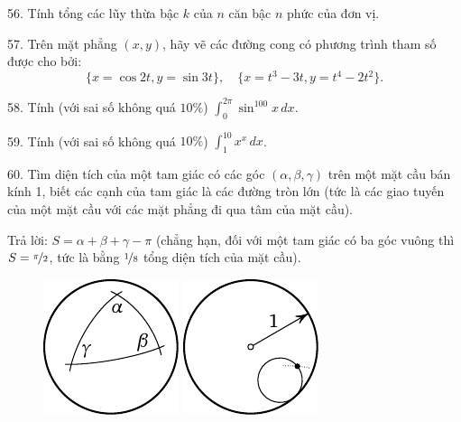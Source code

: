 \begin{problem}{56.}
	Tính tổng các lũy thừa bậc $k$ của $n$ căn bậc $n$ phức của đơn vị.
\end{problem}

\begin{problem}{57.}
	Trên mặt phẳng $(x,y)$, hãy vẽ các đường cong có phương trình tham số được cho bởi:
	\begin{equation*}
		\{x=\cos 2t, y=\sin 3t\},\quad
		\{x=t^3-3t, y=t^4-2t^2\}.
	\end{equation*}
	\vspace{-2\baselineskip}%
\end{problem}

\begin{problem}{58.}
	Tính (với sai số không quá $10 \%$) $\int_0^{2\pi}\sin^{100}x\,dx$.
\end{problem}

\begin{problem}{59.}
	Tính (với sai số không quá $10 \%$) $\int_1^{10} x^x\,dx$.
\end{problem}

\begin{problem}{60.}
	Tìm diện tích của một tam giác có các góc $(\alpha, \beta, \gamma)$ trên một mặt cầu bán kính 1, biết các cạnh của tam giác là các đường tròn lớn (tức là các giao tuyến của một mặt cầu với các mặt phẳng đi qua tâm của mặt cầu).

	\begin{note}{Trả lời:}
		 $S=\alpha+\beta+\gamma-\pi$ (chẳng hạn, đối với một tam giác có ba góc vuông thì $S=\nicefrac{\pi}{2}$, tức là bằng $\nicefrac{1}{8}$ tổng diện tích của mặt cầu).
		\begin{figure}
			\null\hfill
			\includegraphics{resources/taskbook-44}
			\hfill
			\includegraphics{resources/taskbook-45}
			\hfill\null
		\end{figure}
	\end{note}
\end{problem}


